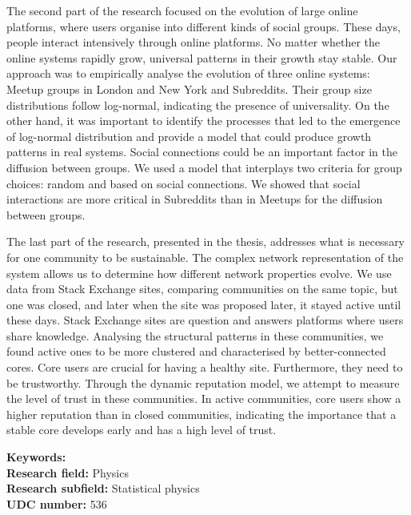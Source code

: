 The second part of the research focused on the evolution of large online platforms, where users organise into different kinds of social groups. These days, people interact intensively through online platforms. No matter whether the online systems rapidly grow, universal patterns in their growth stay stable. Our approach was to empirically analyse the evolution of three online systems: Meetup groups in London and New York and Subreddits. Their group size distributions follow log-normal, indicating the presence of universality.
On the other hand, it was important to identify the processes that led to the emergence of log-normal distribution and provide a model that could produce growth patterns in real systems. Social connections could be an important factor in the diffusion between groups. We used a model that interplays two criteria for group choices: random and based on social connections. We showed that social interactions are more critical in Subreddits than in Meetups for the diffusion between groups. 

The last part of the research, presented in the thesis, addresses what is necessary for one community to be sustainable. The complex network representation of the system allows us to determine how different network properties evolve. We use data from Stack Exchange sites, comparing communities on the same topic, but one was closed, and later when the site was proposed later, it stayed active until these days. Stack Exchange sites are question and answers platforms where users share knowledge. Analysing the structural patterns in these communities, we found active ones to be more clustered and characterised by better-connected cores. Core users are crucial for having a healthy site. Furthermore, they need to be trustworthy. Through the dynamic reputation model, we attempt to measure the level of trust in these communities. In active communities, core users show a higher reputation than in closed communities, indicating the importance that a stable core develops early and has a high level of trust.

\noindent
{\textbf {Keywords:}} \\ %
{\textbf {Research field:}} Physics \\
{\textbf {Research subfield:}} Statistical physics\\
\textbf{UDC number:} 536 %

\hfill

\justify
